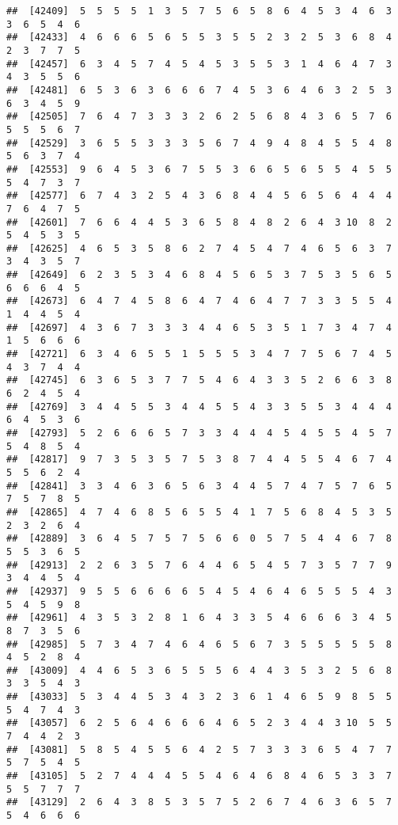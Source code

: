 \documentclass[
]{book}
\begin{document}
\begin{verbatim}
##  [42409]  5  5  5  5  1  3  5  7  5  6  5  8  6  4  5  3  4  6  3  3  6  5  4  6
##  [42433]  4  6  6  6  5  6  5  5  3  5  5  2  3  2  5  3  6  8  4  2  3  7  7  5
##  [42457]  6  3  4  5  7  4  5  4  5  3  5  5  3  1  4  6  4  7  3  4  3  5  5  6
##  [42481]  6  5  3  6  3  6  6  6  7  4  5  3  6  4  6  3  2  5  3  6  3  4  5  9
##  [42505]  7  6  4  7  3  3  3  2  6  2  5  6  8  4  3  6  5  7  6  5  5  5  6  7
##  [42529]  3  6  5  5  3  3  3  5  6  7  4  9  4  8  4  5  5  4  8  5  6  3  7  4
##  [42553]  9  6  4  5  3  6  7  5  5  3  6  6  5  6  5  5  4  5  5  5  4  7  3  7
##  [42577]  6  7  4  3  2  5  4  3  6  8  4  4  5  6  5  6  4  4  4  7  6  4  7  5
##  [42601]  7  6  6  4  4  5  3  6  5  8  4  8  2  6  4  3 10  8  2  5  4  5  3  5
##  [42625]  4  6  5  3  5  8  6  2  7  4  5  4  7  4  6  5  6  3  7  3  4  3  5  7
##  [42649]  6  2  3  5  3  4  6  8  4  5  6  5  3  7  5  3  5  6  5  6  6  6  4  5
##  [42673]  6  4  7  4  5  8  6  4  7  4  6  4  7  7  3  3  5  5  4  1  4  4  5  4
##  [42697]  4  3  6  7  3  3  3  4  4  6  5  3  5  1  7  3  4  7  4  1  5  6  6  6
##  [42721]  6  3  4  6  5  5  1  5  5  5  3  4  7  7  5  6  7  4  5  4  3  7  4  4
##  [42745]  6  3  6  5  3  7  7  5  4  6  4  3  3  5  2  6  6  3  8  6  2  4  5  4
##  [42769]  3  4  4  5  5  3  4  4  5  5  4  3  3  5  5  3  4  4  4  6  4  5  3  6
##  [42793]  5  2  6  6  6  5  7  3  3  4  4  4  5  4  5  5  4  5  7  5  4  8  5  4
##  [42817]  9  7  3  5  3  5  7  5  3  8  7  4  4  5  5  4  6  7  4  5  5  6  2  4
##  [42841]  3  3  4  6  3  6  5  6  3  4  4  5  7  4  7  5  7  6  5  7  5  7  8  5
##  [42865]  4  7  4  6  8  5  6  5  5  4  1  7  5  6  8  4  5  3  5  2  3  2  6  4
##  [42889]  3  6  4  5  7  5  7  5  6  6  0  5  7  5  4  4  6  7  8  5  5  3  6  5
##  [42913]  2  2  6  3  5  7  6  4  4  6  5  4  5  7  3  5  7  7  9  3  4  4  5  4
##  [42937]  9  5  5  6  6  6  6  5  4  5  4  6  4  6  5  5  5  4  3  5  4  5  9  8
##  [42961]  4  3  5  3  2  8  1  6  4  3  3  5  4  6  6  6  3  4  5  8  7  3  5  6
##  [42985]  5  7  3  4  7  4  6  4  6  5  6  7  3  5  5  5  5  5  8  4  5  2  8  4
##  [43009]  4  4  6  5  3  6  5  5  5  6  4  4  3  5  3  2  5  6  8  3  3  5  4  3
##  [43033]  5  3  4  4  5  3  4  3  2  3  6  1  4  6  5  9  8  5  5  5  4  7  4  3
##  [43057]  6  2  5  6  4  6  6  6  4  6  5  2  3  4  4  3 10  5  5  7  4  4  2  3
##  [43081]  5  8  5  4  5  5  6  4  2  5  7  3  3  3  6  5  4  7  7  5  7  5  4  5
##  [43105]  5  2  7  4  4  4  5  5  4  6  4  6  8  4  6  5  3  3  7  5  5  7  7  7
##  [43129]  2  6  4  3  8  5  3  5  7  5  2  6  7  4  6  3  6  5  7  5  4  6  6  6

\end{verbatim}
\end{document}
